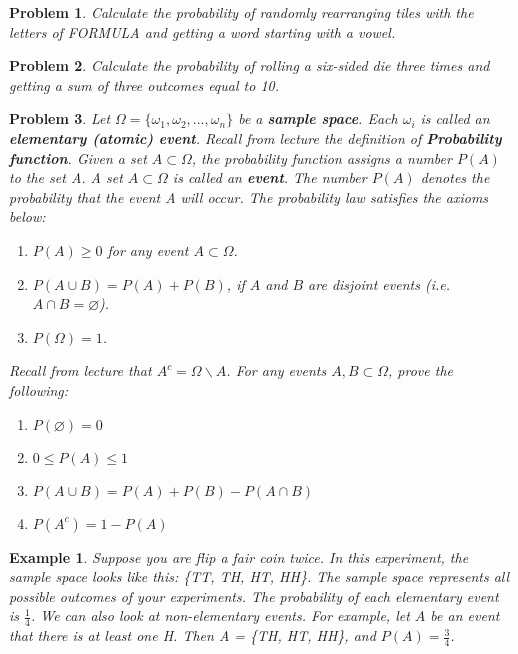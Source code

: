 \documentclass[a4paper,12pt]{article}
\theoremstyle{perfect}
\newtheorem{exm}{Example}
\newtheorem{prb}{Problem}
\begin{document}
\begin{prb}
Calculate the probability of randomly rearranging tiles with the letters of FORMULA and getting a word starting with a vowel.
\end{prb} 

\begin{prb}
Calculate the probability of rolling a six-sided die three times and getting a sum of three outcomes equal to 10.
\end{prb} 


\begin{prb}
Let $\Omega = \{\omega_1, \omega_2, ..., \omega_n\}$ be a \textbf{sample space}. Each $\omega_i$ is called an \textbf{elementary (atomic) event}. Recall from lecture the definition of \textbf{Probability function}. Given a set $A \subset \Omega$, the probability function assigns a number $P(A)$ to the set A. A set $A \subset \Omega$ is called an \textbf{event}. The number $P(A)$ denotes the probability that the event A will occur. The probability law satisfies the axioms below:
\begin{enumerate}
\item $P(A) \geq 0$ for any event $A \subset \Omega$.
\item $P(A \cup B) = P(A) + P(B)$, if $A$ and $B$ are disjoint events (i.e. $A \cap B = \varnothing$).
\item $P(\Omega) = 1$.
\end{enumerate}

\noindent
Recall from lecture that $A^c = \Omega \backslash A$. For any events $A, B \subset \Omega$, prove the following:
\begin{enumerate}
\item $P(\varnothing) = 0$
\item $0 \leq P(A) \leq 1$
\item $P(A \cup B) = P(A) + P(B) - P(A \cap B)$
\item $P(A^c) = 1 - P(A)$
\end{enumerate}
\end{prb}

\begin{exm}
Suppose you are flip a fair coin twice. In this experiment, the sample space looks like this: 
\{TT, TH, HT, HH\}. The sample space represents all possible outcomes of your experiments. The probability of each elementary event is $\frac{1}{4}$. We can also look at non-elementary events. For example, let $A$ be an event that there is at least one H. Then A = \{TH, HT, HH\}, and $P(A) = \frac{3}{4}$. 
\end{exm}
\end{document}
